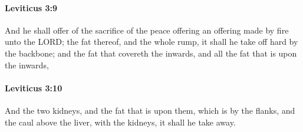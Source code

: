 		\paragraph{Leviticus 3:9} %
			\label{LEVITICUS-3-9}

			And he shall offer of the sacrifice of the peace offering an offering made by fire unto the LORD; the fat thereof, and the whole rump, it shall he take off hard by the backbone; and the fat that covereth the inwards, and all the fat that is upon the inwards,


		\paragraph{Leviticus 3:10} %
			\label{LEVITICUS-3-10}

			And the two kidneys, and the fat that is upon them, which is by the flanks, and the caul above the liver, with the kidneys, it shall he take away.


